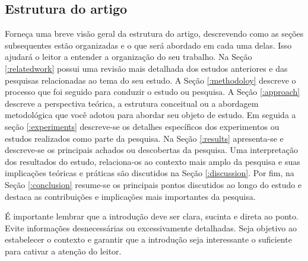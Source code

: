 \subsection{Estrutura do artigo}
Forneça uma breve visão geral da estrutura do artigo, descrevendo como as seções subsequentes estão organizadas e o que será abordado em cada uma delas. Isso ajudará o leitor a entender a organização do seu trabalho. Na Seção \ref{:relatedwork} possui uma revisão mais detalhada dos estudos anteriores e das pesquisas relacionadas ao tema do seu estudo. A Seção \ref{:methodoloy} descreve o processo que foi seguido para conduzir o estudo ou pesquisa. A Seção \ref{:approach} descreve a perspectiva teórica, a estrutura conceitual ou a abordagem metodológica que você adotou para abordar seu objeto de estudo. Em seguida a seção \ref{:experiments} descreve-se os detalhes específicos dos experimentos ou estudos realizados como parte da pesquisa. Na Seção \ref{:results} apresenta-se e descreve-se os principais achados ou descobertas da pesquisa. Uma interpretação dos resultados do estudo, relaciona-os ao contexto mais amplo da pesquisa e suas implicações teóricas e práticas são discutidos na Seção \ref{:discussion}. Por fim, na Seção \ref{:conclusion}  resume-se os principais pontos discutidos ao longo do estudo e destaca as contribuições e implicações mais importantes da pesquisa.

É importante lembrar que a introdução deve ser clara, sucinta e direta ao ponto. Evite informações desnecessárias ou excessivamente detalhadas. Seja objetivo ao estabelecer o contexto e garantir que a introdução seja interessante o suficiente para cativar a atenção do leitor.